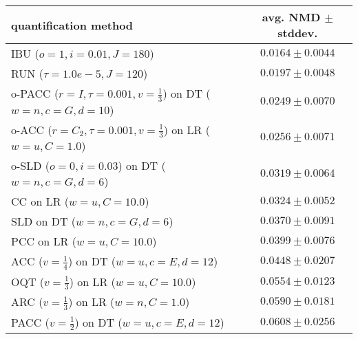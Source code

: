 \begin{tabular}{lc}
  \toprule
  quantification method & avg. NMD $\pm$ stddev. \\
  \midrule
  IBU ($o=1, i=0.01, J=180$) & $\mathbf{0.0164 \pm 0.0044}$ \\
  RUN ($\tau=1.0e-5, J=120$) & $0.0197 \pm 0.0048$ \\
  o-PACC ($r=I, \tau=0.001, v=\frac{1}{3}$) on DT ($w=n, c=G, d=10$) & $0.0249 \pm 0.0070$ \\
  o-ACC ($r=C_2, \tau=0.001, v=\frac{1}{3}$) on LR ($w=u, C=1.0$) & $0.0256 \pm 0.0071$ \\
  o-SLD ($o=0, i=0.03$) on DT ($w=n, c=G, d=6$) & $0.0319 \pm 0.0064$ \\
  CC on LR ($w=u, C=10.0$) & $0.0324 \pm 0.0052$ \\
  SLD on DT ($w=n, c=G, d=6$) & $0.0370 \pm 0.0091$ \\
  PCC on LR ($w=u, C=10.0$) & $0.0399 \pm 0.0076$ \\
  ACC ($v=\frac{1}{4}$) on DT ($w=u, c=E, d=12$) & $0.0448 \pm 0.0207$ \\
  OQT ($v=\frac{1}{3}$) on LR ($w=u, C=10.0$) & $0.0554 \pm 0.0123$ \\
  ARC ($v=\frac{1}{3}$) on LR ($w=n, C=1.0$) & $0.0590 \pm 0.0181$ \\
  PACC ($v=\frac{1}{2}$) on DT ($w=u, c=E, d=12$) & $0.0608 \pm 0.0256$ \\
  \bottomrule
\end{tabular}
